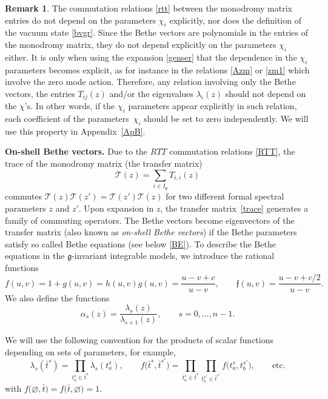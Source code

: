 \documentclass[10pt,a4paper]{amsart}
\newcommand{\bt}{{\bar t}}
\theoremstyle{definition}
\newtheorem{rem}[thm]{Remark}
\def\r#1{\eqref{#1}}
\def\fgo{\mathfrak{f}}
\def\Ig{I_{\mathfrak{g}}}
\begin{document}
\begin{rem}\label{rem: chi homogeneity}
The commutation relations \eqref{rtt} between the monodromy matrix entries do not depend on the parameters $\chi_{i}$ explicitly, nor does the definition of the vacuum state \eqref{bvgr}. Since the Bethe vectors are polynomials in the entries of the monodromy matrix, they do not depend explicitly on the parameters $\chi_{i}$ either.
It is only when using the expansion \eqref{genser} that the dependence in the $\chi_i$ parameters becomes explicit, as for instance in the relations \eqref{Azm} or \eqref{zm1} which involve the zero mode action. Therefore, any relation involving only the Bethe vectors, the entries $T_{ij}(z)$ and/or the eigenvalues $\lambda_i(z)$ should not depend on the $\chi$'s. In other words, if the $\chi_i$ parameters appear explicitly in such relation, each coefficient of the parameters~$\chi_i$ should be set to zero independently. We will use this property in Appendix~\ref{ApB}.
\end{rem}

{\bf On-shell Bethe vectors.}
Due to the $RTT$ commutation relations \r{RTT}, the trace
of the monodromy matrix (the transfer matrix)
\begin{equation}\label{trace}
\mathcal{T}(z)=\sum_{i\in\Ig}T_{i,i}(z)
\end{equation}
commutes
$
\mathcal{T}(z) \mathcal{T}(z')=\mathcal{T}(z') \mathcal{T}(z)
$
for two different formal spectral parameters $z$ and $z'$. Upon expansion in $z$, the transfer matrix~\eqref{trace} generates a family of commuting operators.
The Bethe vectors become eigenvectors of the transfer matrix (also known as {\it on-shell Bethe vectors}) if the Bethe
parameters satisfy so called Bethe equations (see below \r{BE}).
To describe the Bethe equations in the $\mathfrak{g}$-invariant integrable models,
we introduce the rational functions
\[%
f(u,v)=1+g(u,v)=h(u,v)g(u,v)=\frac{u-v+c}{u-v},\qquad \fgo(u,v)=\frac{u-v+c/2}{u-v} .
\]
 We also define the functions
\[%
 \alpha_s(z) = \frac{\lambda_s(z)}{\lambda_{s+1}(z)}, \qquad s = 0, \dots, n-1.
\]

We will use the following convention for the products of scalar
functions depending on sets of parameters, for example,
\begin{equation}\label{eq:convention}
\lambda_s(\bt^s)=\prod_{t^s_a \in \bt^s}\lambda_s(t^s_a),\qquad
f\bigl(\bt^s,\bt^{s'}\bigr)=\prod_{t^s_a \in \bt^s}
\prod_{t^{s'}_b \in \bt^{s'}}f\bigl(t^s_a, t^{s'}_b\bigr),\qquad \mbox{etc.}
\end{equation}
with $f\bigl(\varnothing,\bt\bigr)=f\bigl(\bt,\varnothing\bigr)=1$.
\end{document}
